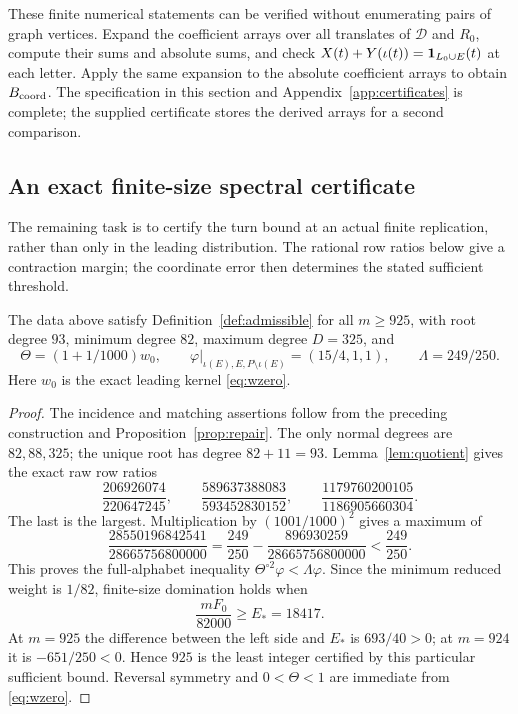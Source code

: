 These finite numerical statements can be verified without enumerating pairs of graph vertices. Expand the coefficient arrays over all translates of $\mathcal D$ and $R_0$, compute their sums and absolute sums, and check $X(t)+Y(\iota(t))=\mathbf1_{L_0\cup E}(t)$ at each letter. Apply the same expansion to the absolute coefficient arrays to obtain $B_{\rm coord}$. The specification in this section and Appendix~\ref{app:certificates} is complete; the supplied certificate stores the derived arrays for a second comparison.

\subsection{An exact finite-size spectral certificate}

The remaining task is to certify the turn bound at an actual finite replication, rather than only in the leading distribution. The rational row ratios below give a contraction margin; the coordinate error then determines the stated sufficient threshold.
\begin{proposition}\label{prop:char3}
The data above satisfy Definition~\ref{def:admissible} for all $m\ge925$, with root degree $93$, minimum degree $82$, maximum degree $D=325$, and
\[
 \Theta=(1+1/1000)w_0,\qquad
 \varphi|_{\iota(E),E,P\setminus\iota(E)}=(15/4,1,1),\qquad
 \Lambda=249/250.
\]
Here $w_0$ is the exact leading kernel \eqref{eq:wzero}.
\end{proposition}
\begin{proof}
The incidence and matching assertions follow from the preceding construction and Proposition~\ref{prop:repair}. The only normal degrees are $82,88,325$; the unique root has degree $82+11=93$. Lemma~\ref{lem:quotient} gives the exact raw row ratios
\[
 \frac{206926074}{220647245},\qquad
 \frac{589637388083}{593452830152},\qquad
 \frac{1179760200105}{1186905660304}.
\]
The last is the largest. Multiplication by $(1001/1000)^2$ gives a maximum of
\[
 \frac{28550196842541}{28665756800000}
 =\frac{249}{250}-\frac{896930259}{28665756800000}
 <\frac{249}{250}.
\]
This proves the full-alphabet inequality $\Theta^{\circ2}\varphi<\Lambda\varphi$. Since the minimum reduced weight is $1/82$, finite-size domination holds when
\[
 \frac{mF_0}{82000}\ge E_*=18417.
\]
At $m=925$ the difference between the left side and $E_*$ is $693/40>0$; at $m=924$ it is $-651/250<0$. Hence $925$ is the least integer certified by this particular sufficient bound. Reversal symmetry and $0<\Theta<1$ are immediate from \eqref{eq:wzero}.
\end{proof}

